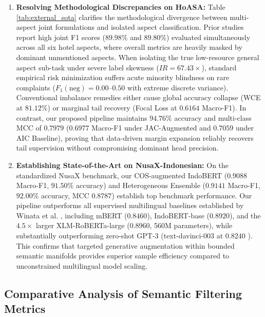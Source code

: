 \documentclass{ieeeaccess}
\begin{document}
\begin{enumerate}
    \item \textbf{Resolving Methodological Discrepancies on HoASA:} Table \ref{tab:external_sota} clarifies the methodological divergence between multi-aspect joint formulations and isolated aspect classification. Prior studies \cite{wilie2020indonlu, purnomo2024comparison} report high joint F1 scores ($89.98\%$ and $89.80\%$) evaluated simultaneously across all six hotel aspects, where overall metrics are heavily masked by dominant unmentioned aspects. When isolating the true low-resource general aspect sub-task under severe label skewness ($IR = 67.43\times$), standard empirical risk minimization suffers acute minority blindness on rare complaints ($F_1(\text{neg})=0.00\text{--}0.50$ with extreme discrete variance). Conventional imbalance remedies either cause global accuracy collapse (WCE at $81.12\%$) or marginal tail recovery (Focal Loss at $0.6164$ Macro-F1). In contrast, our proposed pipeline maintains \textbf{$94.76\%$} accuracy and multi-class MCC of \textbf{$0.7979$} ($0.6977$ Macro-F1 under JAC-Augmented and $0.7059$ under AIC Baseline), proving that data-driven margin expansion reliably recovers tail supervision without compromising dominant head precision.
    \item \textbf{Establishing State-of-the-Art on NusaX-Indonesian:} On the standardized NusaX benchmark, our COS-augmented IndoBERT (\textbf{$0.9088$} Macro-F1, \textbf{$91.50\%$} accuracy) and Heterogeneous Ensemble (\textbf{$0.9141$} Macro-F1, \textbf{$92.00\%$} accuracy, MCC \textbf{$0.8787$}) establish top benchmark performance. Our pipeline outperforms all supervised multilingual baselines established by Winata et al. \cite{winata2023nusax}, including mBERT ($0.8460$), IndoBERT-base ($0.8920$), and the $4.5\times$ larger XLM-RoBERTa-large ($0.8960$, 560M parameters), while substantially outperforming zero-shot GPT-3 (text-davinci-003 at $0.8240$ \cite{cahyawijaya2023nusacrowd}). This confirms that targeted generative augmentation within bounded semantic manifolds provides superior sample efficiency compared to unconstrained multilingual model scaling.
\end{enumerate}

\subsection{Comparative Analysis of Semantic Filtering Metrics}
\label{subsec:metric_comp}
\end{document}
